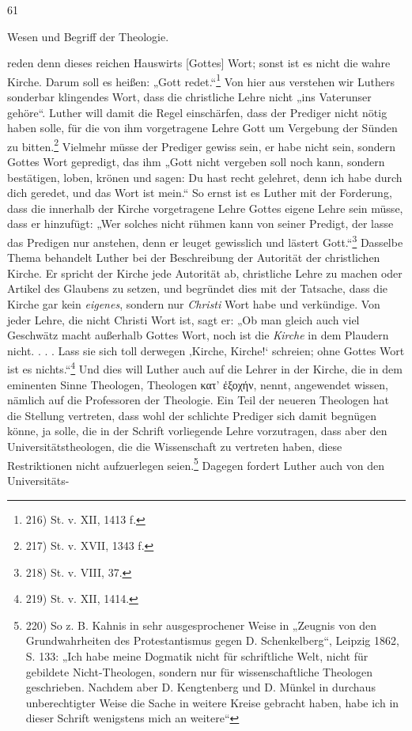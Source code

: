 \begin{flushright} 61 \end{flushright}\begin{flushleft} Wesen und Begriff der Theologie. \end{flushleft}\par reden denn dieses reichen Hauswirts [Gottes] Wort; sonst ist es nicht die wahre Kirche. Darum soll es heißen: „Gott redet.“\footnote{216) St. v. XII, 1413 f.} Von hier aus verstehen wir Luthers sonderbar klingendes Wort, dass die christliche Lehre nicht „ins Vaterunser gehöre“. Luther will damit die Regel einschärfen, dass der Prediger nicht nötig haben solle, für die von ihm vorgetragene Lehre Gott um Vergebung der Sünden zu bitten.\footnote{217) St. v. XVII, 1343 f.} Vielmehr müsse der Prediger gewiss sein, er habe nicht sein, sondern Gottes Wort gepredigt, das ihm „Gott nicht vergeben soll noch kann, sondern bestätigen, loben, krönen und sagen: Du hast recht gelehret, denn ich habe durch dich geredet, und das Wort ist mein.“ So ernst ist es Luther mit der Forderung, dass die innerhalb der Kirche vorgetragene Lehre Gottes eigene Lehre sein müsse, dass er hinzufügt: „Wer solches nicht rühmen kann von seiner Predigt, der lasse das Predigen nur anstehen, denn er leuget gewisslich und lästert Gott.“\footnote{218) St. v. VIII, 37.} Dasselbe Thema behandelt Luther bei der Beschreibung der Autorität der christlichen Kirche. Er spricht der Kirche jede Autorität ab, christliche Lehre zu machen oder Artikel des Glaubens zu setzen, und begründet dies mit der Tatsache, dass die Kirche gar kein \emph{eigenes}, sondern nur \emph{Christi} Wort habe und verkündige. Von jeder Lehre, die nicht Christi Wort ist, sagt er: „Ob man gleich auch viel Geschwätz macht außerhalb Gottes Wort, noch ist die \emph{Kirche} in dem Plaudern nicht. . . . Lass sie sich toll derwegen ‚Kirche, Kirche!‘ schreien; ohne Gottes Wort ist es nichts.“\footnote{219) St. v. XII, 1414.} Und dies will Luther auch auf die Lehrer in der Kirche, die in dem eminenten Sinne Theologen, Theologen κατ' ἐξοχήν, nennt, angewendet wissen, nämlich auf die Professoren der Theologie. Ein Teil der neueren Theologen hat die Stellung vertreten, dass wohl der schlichte Prediger sich damit begnügen könne, ja solle, die in der Schrift vorliegende Lehre vorzutragen, dass aber den Universitätstheologen, die die Wissenschaft zu vertreten haben, diese Restriktionen nicht aufzuerlegen seien.\footnote{220) So z. B. Kahnis in sehr ausgesprochener Weise in „Zeugnis von den Grundwahrheiten des Protestantismus gegen D. Schenkelberg“, Leipzig 1862, S. 133: „Ich habe meine Dogmatik nicht für schriftliche Welt, nicht für gebildete Nicht-Theologen, sondern nur für wissenschaftliche Theologen geschrieben. Nachdem aber D. Kengtenberg und D. Münkel in durchaus unberechtigter Weise die Sache in weitere Kreise gebracht haben, habe ich in dieser Schrift wenigstens mich an weitere“} Dagegen fordert Luther auch von den Universitäts-
